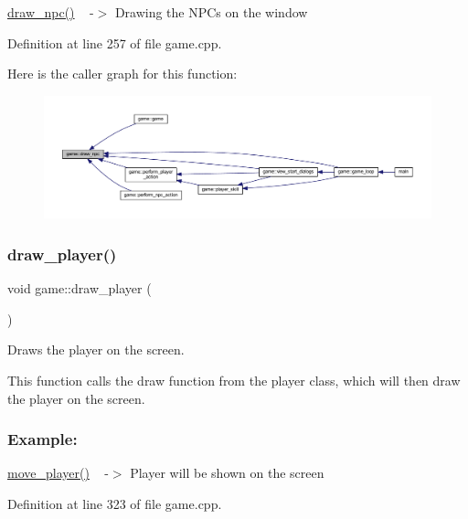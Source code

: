 \hyperlink{classgame_a961fe8a42a2c0bc1ef62ef17c7c64f06}{draw\+\_\+npc()} ~\newline
-\/$>$ Drawing the N\+PC\textquotesingle{}s on the window 

Definition at line 257 of file game.\+cpp.

Here is the caller graph for this function\+:
\nopagebreak
\begin{figure}[H]
\begin{center}
\leavevmode
\includegraphics[width=350pt]{classgame_a961fe8a42a2c0bc1ef62ef17c7c64f06_icgraph}
\end{center}
\end{figure}
\mbox{\label{classgame_a4982a1c81b1a52b8f050ef48dea86743}} 
\subsubsection{\texorpdfstring{draw\+\_\+player()}{draw\_player()}}
{\footnotesize\ttfamily void game\+::draw\+\_\+player (\begin{DoxyParamCaption}{ }\end{DoxyParamCaption})\hspace{0.3cm}{\ttfamily [private]}}



Draws the player on the screen. 

This function calls the draw function from the \textquotesingle{}player\textquotesingle{} class, which will then draw the player on the screen.

\subsubsection*{Example\+: }

\hyperlink{classgame_ab13015cdc535671de1dd7a5a7970a238}{move\+\_\+player()} ~\newline
-\/$>$ Player will be shown on the screen 

Definition at line 323 of file game.\+cpp.

